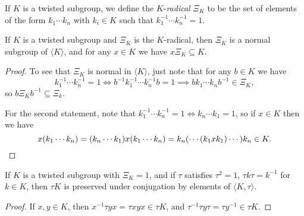 \begin{defn} If $K$ is a twisted subgroup, we define the $K$-\emph{radical} $\Xi_K$ to be the set of elements of the form $k_1 \cdots k_n$ with $k_i \in K$ such that $k_1^{-1}\cdots k_n^{-1} = 1$.
\end{defn}

\begin{prop} If $K$ is a twisted subgroup and $\Xi_K$ is the $K$-radical, then $\Xi_K$ is a normal subgroup of $\langle K\rangle$, and for any $x \in K$ we have $x\Xi_K \subseteq K$.
\end{prop}
\begin{proof} To see that $\Xi_K$ is normal in $\langle K\rangle$, just note that for any $b \in K$ we have
\[
k_1^{-1}\cdots k_n^{-1} = 1 \iff b^{-1}k_1^{-1}\cdots k_n^{-1}b = 1 \implies bk_1\cdots k_nb^{-1} \in \Xi_K,
\]
so $b\Xi_Kb^{-1} \subseteq \Xi_k$.

For the second statement, note that $k_1^{-1} \cdots k_n^{-1} = 1 \iff k_n\cdots k_1 = 1$, so if $x \in K$ then we have
\[
x(k_1\cdots k_n) = (k_n\cdots k_1)x(k_1\cdots k_n) = k_n(\cdots(k_1 x k_1)\cdots)k_n \in K.\qedhere
\]
\end{proof}

\begin{prop} If $K$ is a twisted subgroup with $\Xi_K = 1$, and if $\tau$ satisfies $\tau^2 = 1$, $\tau k\tau = k^{-1}$ for $k \in K$, then $\tau K$ is preserved under conjugation by elements of $\langle K,\tau\rangle$.
\end{prop}
\begin{proof} If $x,y \in K$, then $x^{-1} \tau y x = \tau xyx \in \tau K$, and $\tau^{-1} \tau y\tau = \tau y^{-1} \in \tau K$.
\end{proof}

